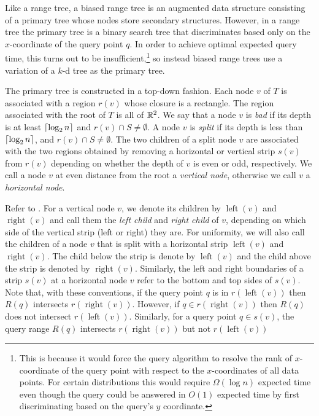 \documentclass[charterfonts]{patmorin}
\DeclareMathOperator{\lft}{left}
\DeclareMathOperator{\rght}{right}
\begin{document}
Like a range tree, a biased range tree is an augmented data structure
consisting of a primary tree whose nodes store secondary structures.
However, in a range tree the primary tree is a binary search tree that
discriminates based only on the $x$-coordinate of the query point $q$.  In
order to achieve optimal expected query time, this turns out to be
insufficient,\footnote{This is because it would force the query algorithm
to resolve the rank of $x$-coordinate of the query point with respect to
the $x$-coordinates of all data points. For certain distributions this
would require $\Omega(\log n)$ expected time even though the query could be
answered in $O(1)$ expected time by first discriminating based on the
query's $y$ coordinate.} so instead biased range trees use a variation of a
$k$-d tree as the primary tree.

The primary tree is constructed in a top-down fashion.  Each node $v$ of
$T$ is associated with a region $r(v)$ whose closure is a rectangle.  The
region associated with the root of $T$ is all of $\mathbb{R}^2$.  We say that a
node $v$ is \emph{bad} if its depth is at least $\left\lceil \log_2 n \right\rceil$ and
$r(v)\cap S \neq \emptyset$.  A node $v$ is \emph{split} if its depth is
less than $\left\lceil \log_2 n \right\rceil$, and $r(v)\cap S\neq \emptyset$.  The two
children of a split node $v$ are associated with the two regions obtained
by removing a horizontal or vertical strip $s(v)$ from $r(v)$ depending on
whether the depth of $v$ is even or odd, respectively.  We call a node $v$
at even distance from the root a \emph{vertical node}, otherwise we call
$v$ a \emph{horizontal node}. 

Refer to .  For a vertical node $v$, we denote its
children by $\lft(v)$ and $\rght(v)$ and call them the \emph{left child}
and \emph{right child} of $v$, depending on which side of the vertical
strip (left or right) they are.  For uniformity, we will also call the
children of a node $v$ that is split with a horizontal strip $\lft(v)$ and
$\rght(v)$.  The child below the strip is denote by $\lft(v)$ and the child
above the strip is denoted by $\rght(v)$.  Similarly, the left and right
boundaries of a strip $s(v)$ at a horizontal node $v$ refer to the bottom
and top sides of $s(v)$.  Note that, with these conventions, if the query
point $q$ is in $r(\lft(v))$ then $R(q)$ intersects $r(\rght(v))$.
However, if $q\in r(\rght(v))$ then $R(q)$ does not intersect $r(\lft(v))$.
Similarly, for a query point $q\in s(v)$, the query range $R(q)$ intersects
$r(\rght(v))$ but not $r(\lft(v))$
\end{document}
